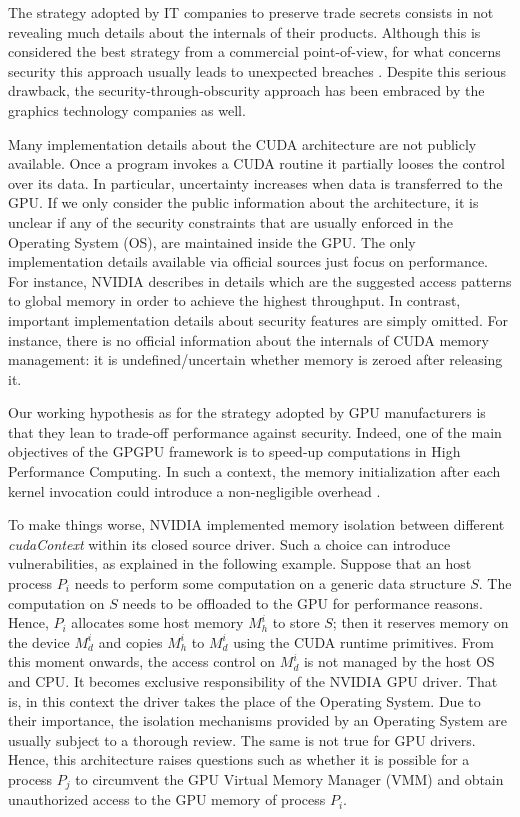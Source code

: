 \documentclass[11pt,onecolumn,letterpaper]{IEEEtran}
\begin{document}
The strategy adopted by IT companies to preserve trade secrets consists in not revealing much details
about the internals of their products.
Although this is considered the best strategy from a commercial point-of-view, for what concerns security 
this approach usually leads to unexpected breaches \cite{securitythroughobscurity}.
Despite this serious drawback, the security-through-obscurity approach has been embraced by the graphics technology companies as well.

Many implementation details about the CUDA architecture are not publicly available. 
Once a program invokes a CUDA routine it partially looses the control over its data. 
In particular, uncertainty increases when data is transferred to the GPU. 
If we only consider the public information about the architecture, 
it is unclear if any of the security constraints that are usually enforced in the Operating System (OS), 
are maintained inside the GPU.
The only implementation details available via official sources just focus on performance. 
For instance, NVIDIA describes in details which are the suggested access patterns to global memory in order to achieve the highest throughput.
In contrast, important implementation details about security features are simply omitted.
For instance,  there is no official information about the internals of CUDA memory management: it is undefined/uncertain whether memory is zeroed \cite{zeroizzazione2} after releasing it.

Our working hypothesis as for the strategy adopted by GPU manufacturers is that they lean to trade-off performance against security.
Indeed, one of the main objectives of the GPGPU framework is to speed-up computations in High Performance Computing.
In such a context, the memory initialization after each kernel invocation could introduce a non-negligible overhead \cite{zeroingoverhead}. 

To make things worse, NVIDIA implemented memory isolation between different \emph{cudaContext} within its closed source driver.
Such a choice can introduce vulnerabilities, as explained in the following example.
Suppose that an host process $P_i$ needs to perform some computation on a generic data structure $S$.
The computation on $S$ needs to be offloaded to the GPU for performance reasons.
Hence, $P_i$ allocates some host memory $M_h^i$ to store $S$;
then it reserves memory on the device $M_d^i$ and copies $M_h^i$ to $M_d^i$ using the CUDA runtime primitives.
From this moment onwards, the access control on $M_d^i$ is not managed by the host OS and CPU.
It becomes exclusive responsibility of the NVIDIA GPU driver. 
That is, in this context the driver takes the place of the Operating System.
Due to their importance, the isolation mechanisms provided by an Operating System are usually subject to a thorough review.
The same is not true for GPU drivers.
Hence, this architecture raises questions such as whether it is possible for a process $P_j$ to circumvent
the GPU Virtual Memory Manager (VMM) and obtain unauthorized access to the GPU memory of process $P_i$. 
\end{document}
